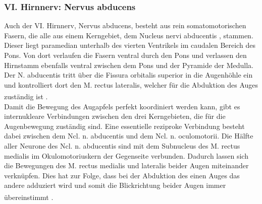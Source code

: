 \documentclass[12pt,a4paper,pdftex]{article}
\begin{document}
\subsubsection*{VI. Hirnnerv: Nervus abducens} 
Auch der VI. Hirnnerv, Nervus abducens, besteht aus rein somatomotorischen Fasern, die alle aus einem Kerngebiet, dem Nucleus nervi abducentis , stammen. Dieser liegt paramedian unterhalb des vierten Ventrikels im caudalen Bereich des Pons. Von dort verlaufen die Fasern ventral durch den Pons und verlassen den Hirnstamm ebenfalls ventral zwischen dem Pons und der Pyramide der Medulla. Der N. abducentis tritt über die Fissura orbitalis superior in die Augenhöhle ein und kontrolliert dort den M. rectus lateralis, welcher für die Abduktion des Auges zuständig ist \textsuperscript{\cite[10]{crossman2014neuroanatomy}}. \\    
Damit die Bewegung des Augapfels perfekt koordiniert werden kann, gibt es internukleare Verbindungen zwischen den drei Kerngebieten, die für die Augenbewegung zuständig sind.    
Eine essentielle reziproke Verbindung besteht dabei zwischen dem Ncl. n. abducentis und dem Ncl. n. oculomotorii. Die Hälfte aller Neurone des Ncl. n. abducentis sind mit dem Subnucleus des M. rectus medialis im Okulomotoriuskern der Gegenseite verbunden. Dadurch lassen sich die Bewegungen des M. rectus medialis und lateralis beider Augen miteinander verknüpfen. Dies hat zur Folge, dass bei der Abduktion des einen Auges das andere adduziert wird und somit die Blickrichtung beider Augen immer übereinstimmt \textsuperscript{\cite[6]{trepel2011neuroanatomie}}. 
\end{document}
